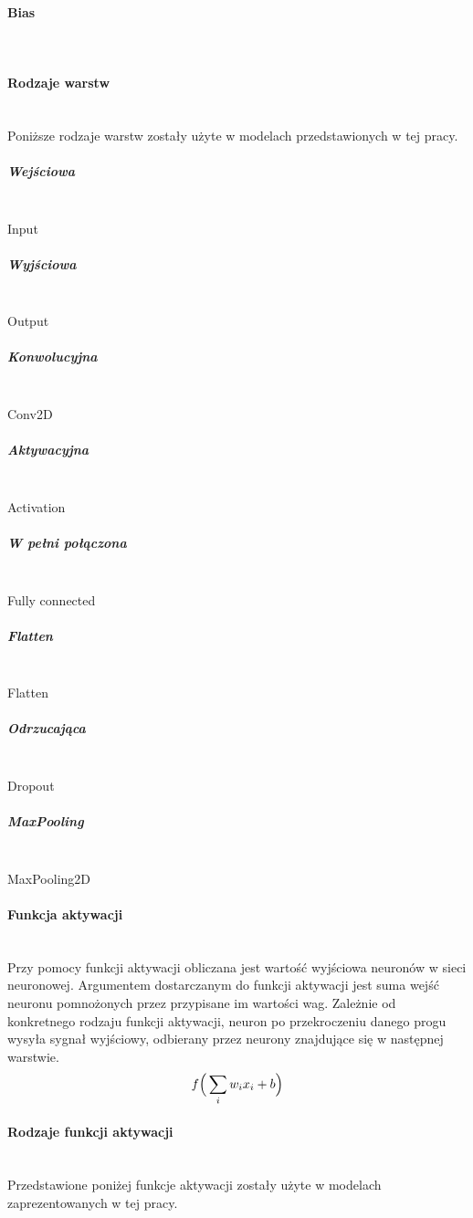 \paragraph{Bias} \mbox{}\\

\paragraph{Rodzaje warstw} \mbox{}\\
Poniższe rodzaje warstw zostały użyte w modelach przedstawionych w tej pracy.

\subparagraph{Wejściowa}  \mbox{}\\
Input

\subparagraph{Wyjściowa}  \mbox{}\\
Output

\subparagraph{Konwolucyjna}  \mbox{}\\
Conv2D

\subparagraph{Aktywacyjna}  \mbox{}\\
Activation

\subparagraph{W pełni połączona}  \mbox{}\\
Fully connected

\subparagraph{Flatten}  \mbox{}\\
Flatten

\subparagraph{Odrzucająca}  \mbox{}\\
Dropout

\subparagraph{MaxPooling}  \mbox{}\\
MaxPooling2D


\paragraph{Funkcja aktywacji} \mbox{}\\
Przy pomocy funkcji aktywacji obliczana jest wartość wyjściowa neuronów w sieci
neuronowej. Argumentem dostarczanym do funkcji aktywacji jest suma wejść neuronu
pomnożonych przez przypisane im wartości wag. Zależnie od konkretnego rodzaju funkcji
aktywacji, neuron po przekroczeniu danego progu wysyła sygnał wyjściowy, odbierany
przez neurony znajdujące się w następnej warstwie.
\begin{equation}
f\Big(\sum_{i}w_{i}x_{i} + b\Big) \\
\end{equation}

\paragraph{Rodzaje funkcji aktywacji} \mbox{}\\
Przedstawione poniżej funkcje aktywacji zostały użyte w modelach zaprezentowanych
w tej pracy.

